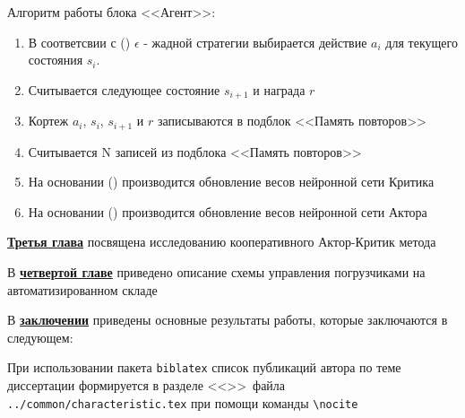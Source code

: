 Алгоритм работы блока <<Агент>>:
\begin{enumerate}
	\item В соответсвии с () $ \epsilon $ - жадной стратегии выбирается действие $ a_i $ для текущего состояния $ s_i $.
	\item Считывается следующее состояние $ s_{i+1} $ и награда $ r $
	\item Кортеж $ a_i $, $ s_i $, $ s_{i+1} $ и $ r $ записываются в подблок <<Память повторов>>
	\item Считывается N записей из подблока <<Память повторов>>
	\item На основании () производится обновление весов нейронной сети Критика
	\item На основании () производится обновление весов нейронной сети Актора
\end{enumerate}



\underline{\textbf{Третья глава}} посвящена исследованию кооперативного Актор-Критик метода

В \underline{\textbf{четвертой главе}} приведено описание схемы управления погрузчиками на автоматизированном складе

В \underline{\textbf{заключении}} приведены основные результаты работы, которые заключаются в следующем:



При использовании пакета \verb!biblatex! список публикаций автора по теме
диссертации формируется в разделе <<\publications>>\ файла
\verb!../common/characteristic.tex!  при помощи команды \verb!\nocite! 


